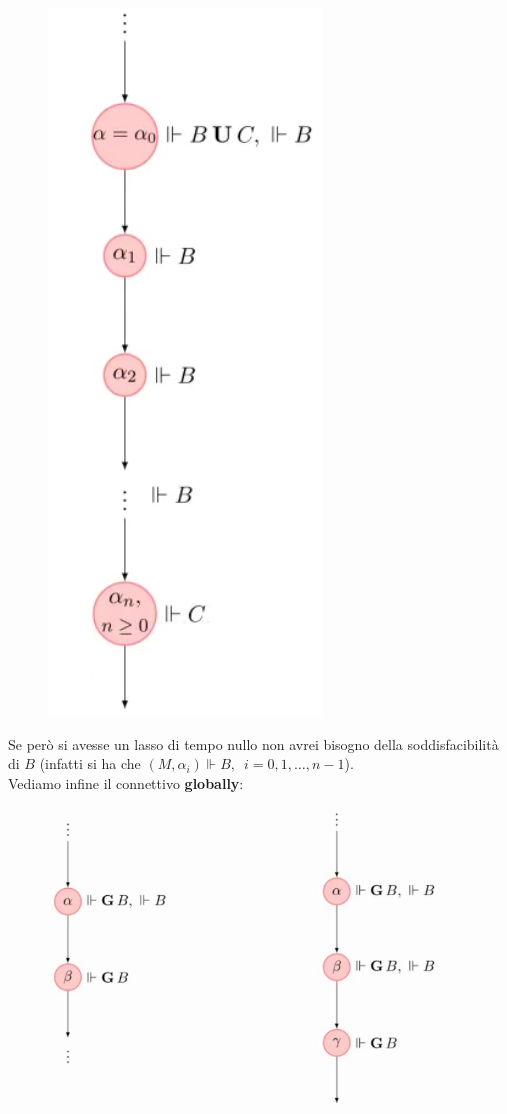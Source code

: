 \documentclass[a4paper,12pt, oneside]{book}
\begin{document}
\begin{esempio}
\begin{figure}[H]
    \includegraphics[scale = 0.27]{img/pltl4.png}
  \end{figure}
  Se però si avesse un lasso di tempo nullo non avrei bisogno della
  soddisfacibilità di $B$ (infatti si ha che $(M,\alpha_i)\Vdash
  B,\,\,\,i=0,1,\ldots,n-1$).\\ 
  Vediamo infine il connettivo \textbf{globally}:
  \begin{figure}[H]
    \centering
    \includegraphics[scale = 0.35]{img/pltl5.png}

\end{figure}
\end{esempio}
\end{document}
